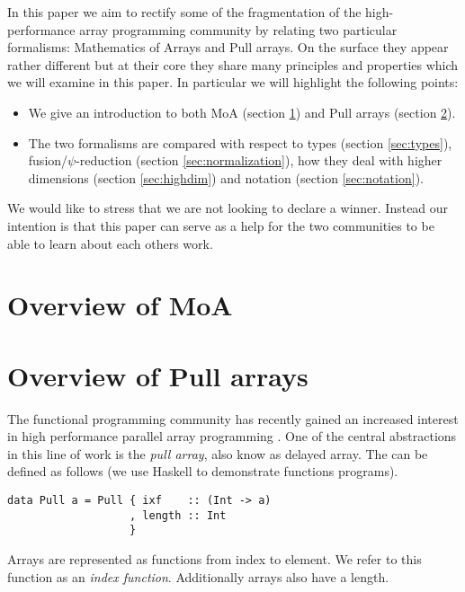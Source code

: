 \documentclass{sigplanconf}
\begin{document}
In this paper we aim to rectify some of the fragmentation of the
high-performance array programming community by relating two
particular formalisms: Mathematics of Arrays and Pull arrays. On the
surface they appear rather different but at their core they share many
principles and properties which we will examine in this paper. In
particular we will highlight the following points:
\begin{itemize}
\item We give an introduction to both MoA (section \ref{sec:moa}) and Pull
  arrays (section \ref{sec:pull}).
\item The two formalisms are compared with respect to types (section
  \ref{sec:types}), fusion/\(\psi\)-reduction (section
  \ref{sec:normalization}), how they deal with higher dimensions
  (section \ref{sec:highdim}) and notation (section \ref{sec:notation}).
\end{itemize}

We would like to stress that we are not looking to declare a
winner. Instead our intention is that this paper can serve as a help
for the two communities to be able to learn about each others work.

\section{Overview of MoA}
\label{sec:moa}

\section{Overview of Pull arrays}
\label{sec:pull}

The functional programming community has recently gained an increased
interest in high performance parallel array programming
\cite{keller2010regular,Axelsson:2010:Feldspar,Mainland:2010:Nikola,Svensson:2011:Obsidian,Claessen:2012:Expressive,Ankner:2013:AnEDSL,lippmeier2011efficient}. One
of the central abstractions in this line of work is the \emph{pull
  array}, also know as delayed array. The can be defined as follows
(we use Haskell \cite{marlow2010haskell} to demonstrate functions
programs).

\begin{verbatim}
data Pull a = Pull { ixf    :: (Int -> a)
                   , length :: Int
                   }
\end{verbatim}

Arrays are represented as functions from index to element. We refer to
this function as an \emph{index function}. Additionally arrays also
have a length.
\end{document}
